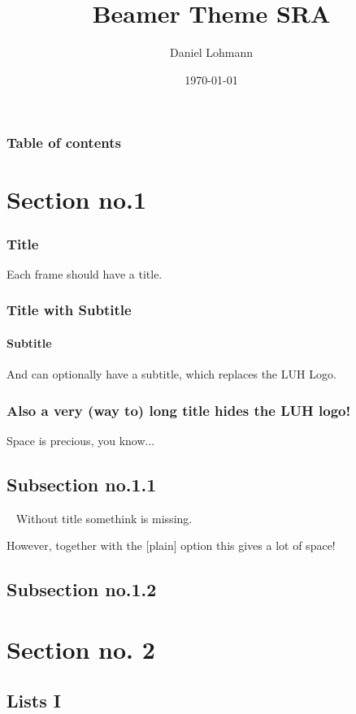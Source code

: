 \documentclass{beamer}
\begin{document}
\title{Beamer Theme SRA}
\author[dl]{Daniel Lohmann}
\date{\today} 

\begin{frame}[title]
	\titlepage
\end{frame}

\begin{frame}\frametitle{Table of contents}\tableofcontents
\end{frame} 


\section{Section no.1} 

\begin{frame}
	\frametitle{Title} 
	Each frame should have a title.
\end{frame}

\begin{frame}
	\frametitle{Title with Subtitle}
	\framesubtitle{Subtitle} 
	And can optionally have a subtitle, which replaces the LUH Logo.
\end{frame}

\begin{frame}
	\frametitle{Also a very (way to) long title hides the LUH logo!}
	Space is precious, you know...
\end{frame}

\subsection{Subsection no.1.1  }

\begin{frame}{~}
	Without title somethink is missing. 
\end{frame}

\begin{frame}[plain]{} 
	However, together with the [plain] option this gives a lot of space! 
\end{frame}

\subsection{Subsection no.1.2}

\section{Section no. 2} 

\subsection{Lists I}
\end{document}
